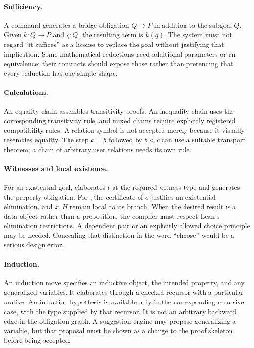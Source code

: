 \documentclass[11pt,a4paper]{article}
\newcommand{\code}[1]{\texttt{\detokenize{#1}}}
\theoremstyle{remark}
\begin{document}
\paragraph{Sufficiency.}
A command \code{suffices Q by r} generates a bridge obligation $Q\to P$ in addition to the subgoal $Q$. Given $k:Q\to P$ and $q:Q$, the resulting term is $k(q)$. The system must not regard ``it suffices'' as a license to replace the goal without justifying that implication. Some mathematical reductions need additional parameters or an equivalence; their contracts should expose those rather than pretending that every reduction has one simple shape.

\paragraph{Calculations.}
An equality chain assembles transitivity proofs. An inequality chain uses the corresponding transitivity rule, and mixed chains require explicitly registered compatibility rules. A relation symbol is not accepted merely because it visually resembles equality. The step $a=b$ followed by $b<c$ can use a suitable transport theorem; a chain of arbitrary user relations needs its own rule.

\paragraph{Witnesses and local existence.}
For an existential goal, \code{choose x := t} elaborates $t$ at the required witness type and generates the property obligation. For \code{obtain x with H from e}, the certificate of $e$ justifies an existential elimination, and $x,H$ remain local to its branch. When the desired result is a data object rather than a proposition, the compiler must respect Lean's elimination restrictions. A dependent pair or an explicitly allowed choice principle may be needed. Concealing that distinction in the word ``choose'' would be a serious design error.

\paragraph{Induction.}
An induction move specifies an inductive object, the intended property, and any generalized variables. It elaborates through a checked recursor with a particular motive. An induction hypothesis is available only in the corresponding recursive case, with the type supplied by that recursor. It is not an arbitrary backward edge in the obligation graph. A suggestion engine may propose generalizing a variable, but that proposal must be shown as a change to the proof skeleton before being accepted.
\end{document}
